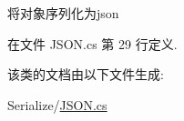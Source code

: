将对象序列化为json 



在文件 J\-S\-O\-N.\-cs 第 29 行定义.



该类的文档由以下文件生成\-:\begin{DoxyCompactItemize}
\item 
Serialize/\hyperlink{_j_s_o_n_8cs}{J\-S\-O\-N.\-cs}\end{DoxyCompactItemize}

